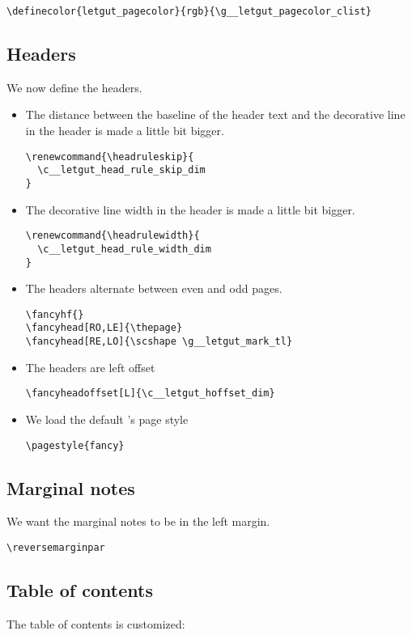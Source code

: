 \documentclass{letgut}
\begin{document}
\begin{lstlisting}
\definecolor{letgut_pagecolor}{rgb}{\g__letgut_pagecolor_clist}
\end{lstlisting}

\subsection{Headers}
\label{ImplementationHeaders-78ig55h0jlj0}
We now define the headers.

\begin{itemize}
\item The distance between the baseline of the header text and the decorative line
in the header is made a little bit bigger.
\begin{lstlisting}
\renewcommand{\headruleskip}{
  \c__letgut_head_rule_skip_dim
}
\end{lstlisting}
\item The decorative line width in the header is made a little bit bigger.
\begin{lstlisting}
\renewcommand{\headrulewidth}{
  \c__letgut_head_rule_width_dim
}
\end{lstlisting}
\item The headers alternate between even and odd pages.
\begin{lstlisting}
\fancyhf{}
\fancyhead[RO,LE]{\thepage}
\fancyhead[RE,LO]{\scshape \g__letgut_mark_tl}
\end{lstlisting}
\item The headers are left offset
\begin{lstlisting}
\fancyheadoffset[L]{\c__letgut_hoffset_dim}
\end{lstlisting}
\item We load the default 's page style
\begin{lstlisting}
\pagestyle{fancy}
\end{lstlisting}
\end{itemize}

\subsection{Marginal notes}
\label{ImplementationMarginalnotes-1uig55h0jlj0}
We want the marginal notes to be in the left margin.

\begin{lstlisting}
\reversemarginpar
\end{lstlisting}

\subsection{Table of contents}
\label{ImplementationTableofcontents-rhjg55h0jlj0}
The table of contents is customized:
\end{document}

